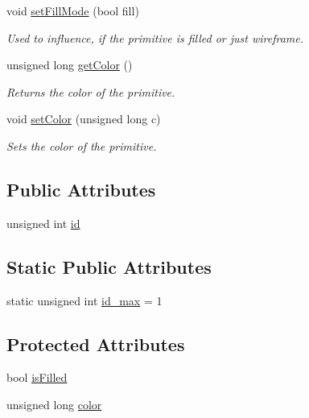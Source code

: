 \begin{DoxyCompactItemize}
void \hyperlink{class_s3_d_primitive_afd54077b1dbe256b9c6dfe67da7b0a0b}{setFillMode} (bool fill)
\begin{DoxyCompactList}\small\item\em Used to influence, if the primitive is filled or just wireframe. \item\end{DoxyCompactList}\item 
unsigned long \hyperlink{class_s3_d_primitive_a4102845e7754e44c51a87c0fcb391c73}{getColor} ()
\begin{DoxyCompactList}\small\item\em Returns the color of the primitive. \item\end{DoxyCompactList}\item 
void \hyperlink{class_s3_d_primitive_a1c8f036193987522bdfb6a49b9b74000}{setColor} (unsigned long c)
\begin{DoxyCompactList}\small\item\em Sets the color of the primitive. \item\end{DoxyCompactList}\end{DoxyCompactItemize}
\subsection*{Public Attributes}
\begin{DoxyCompactItemize}
\item 
unsigned int \hyperlink{class_s3_d_primitive_ae8ff735495c481dbbd0c99ffe16d954f}{id}
\end{DoxyCompactItemize}
\subsection*{Static Public Attributes}
\begin{DoxyCompactItemize}
\item 
static unsigned int \hyperlink{class_s3_d_primitive_a08ee26517002051f19202d8b62bf2b46}{id\_\-max} = 1
\end{DoxyCompactItemize}
\subsection*{Protected Attributes}
\begin{DoxyCompactItemize}
\item 
bool \hyperlink{class_s3_d_primitive_ae5b091719cc1afa825a4ba0e1dfce670}{isFilled}
\item 
unsigned long \hyperlink{class_s3_d_primitive_afc81699d5253aab2757a2c5e33848a22}{color}
\end{DoxyCompactItemize}


